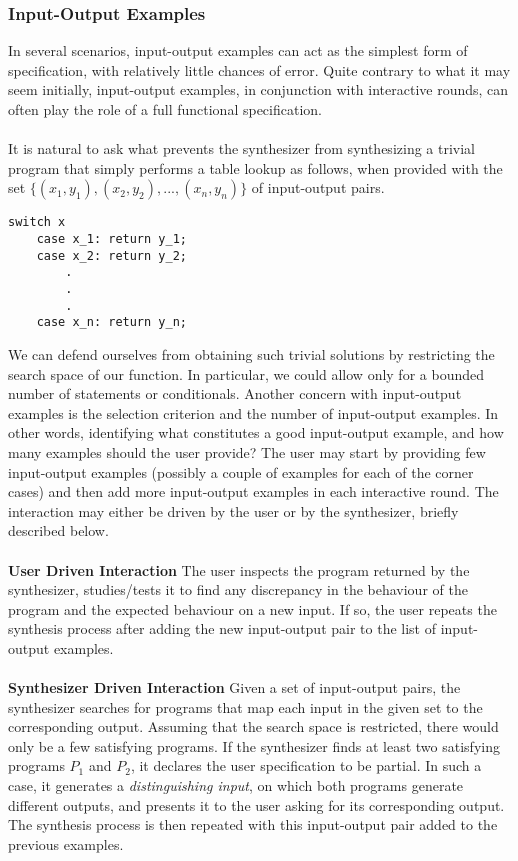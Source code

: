 \subsubsection{Input-Output Examples}
In several scenarios, input-output examples can act as the simplest form of specification, with relatively little chances of error. Quite contrary to what it may seem initially, input-output examples, in conjunction with interactive rounds, can often play the role of a full functional specification. \\\\
It is natural to ask what prevents the synthesizer from synthesizing a trivial program that simply performs a table lookup as follows, when provided with the set $\{(x_1,y_1), (x_2,y_2),..., (x_n,y_n)\}$ of input-output pairs. \\
\begin{lstlisting}
switch x
	case x_1: return y_1;
	case x_2: return y_2;
		.
		.
		.
	case x_n: return y_n;
\end{lstlisting}
We can defend ourselves from obtaining such trivial solutions by restricting the search space of our function. In particular, we could allow only for a bounded number of statements or conditionals. Another concern with input-output examples is the selection criterion and the number of input-output examples. In other words, identifying what constitutes a good input-output example, and how many examples should the user provide? The user may start by providing few input-output examples (possibly a couple of examples for each of the corner cases) and then add more input-output examples in each interactive round. The interaction may either be driven by the user or by the synthesizer, briefly described below. \\\\
\textbf{User Driven Interaction} The user inspects the program returned by the synthesizer, studies/tests it to find any discrepancy in the behaviour of the program and the expected behaviour on a new input. If so, the user repeats the synthesis process after adding the new input-output pair to the list of input-output examples. \\\\
\textbf{Synthesizer Driven Interaction} Given a set of input-output pairs, the synthesizer searches for programs that map each input in the given set to the corresponding output. Assuming that the search space is restricted, there would only be a few satisfying programs. If the synthesizer finds at least two satisfying programs $P_1$ and $P_2$, it declares the user specification to be partial. In such a case, it generates a \emph{distinguishing input}, on which both programs generate different outputs, and presents it to the user asking for its corresponding output. The synthesis process is then repeated with this input-output pair added to the previous examples.\\\\
